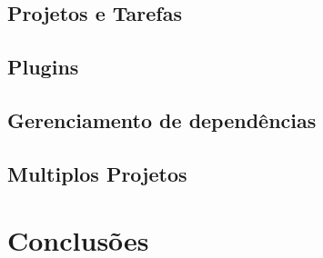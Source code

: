 \documentclass{beamer}
\begin{document}
\subsection{Projetos e Tarefas}

\subsection{Plugins}

\subsection{Gerenciamento de dependências}

\subsection{Multiplos Projetos}

\section{Conclusões}
\end{document}

